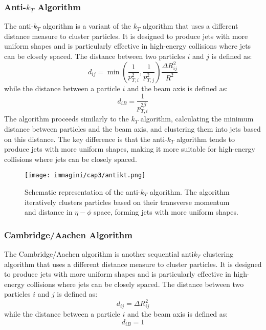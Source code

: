 \subsubsection{Anti-$k_T$ Algorithm}
The anti-$k_T$ algorithm is a variant of the $k_T$ algorithm that uses a different distance measure to cluster particles. It is designed to produce jets with more uniform shapes and is particularly effective in high-energy collisions where jets can be closely spaced.
The distance between two particles $i$ and $j$ is defined as:
\begin{equation}
    d_{ij} = \min(\dfrac{1}{p_{T,i}^2},\dfrac{1}{p_{T,j}^2}) \dfrac{\Delta R_{ij}^2}{R^2}
\end{equation}
while the distance between a particle $i$ and the beam axis is defined as:
\begin{equation}
    d_{iB} = \dfrac{1}{p_{T,i}^{2\beta}}
\end{equation}
The algorithm proceeds similarly to the $k_T$ algorithm, calculating the minimum distance between particles and the beam axis, and clustering them into jets based on this distance. The key difference is that the anti-$k_T$ algorithm tends to produce jets with more uniform shapes, making it more suitable for high-energy collisions where jets can be closely spaced.
\begin{figure}[h!]
    \centering
    \texttt{[image: immagini/cap3/antikt.png]}
    \caption{Schematic representation of the anti-$k_T$ algorithm. The algorithm iteratively clusters particles based on their transverse momentum and distance in $\eta - \phi$ space, forming jets with more uniform shapes.}
    \label{fig:antikt_algorithm}
\end{figure}

\subsubsection{Cambridge/Aachen Algorithm}
The Cambridge/Aachen algorithm is another sequential anti$k_T$ clustering algorithm that uses a different distance measure to cluster particles. It is designed to produce jets with more uniform shapes and is particularly effective in high-energy collisions where jets can be closely spaced.
The distance between two particles $i$ and $j$ is defined as:
\begin{equation}
    d_{ij} = \Delta R_{ij}^2
\end{equation}
while the distance between a particle $i$ and the beam axis is defined as:
\begin{equation}
    d_{iB} =  1
\end{equation}


